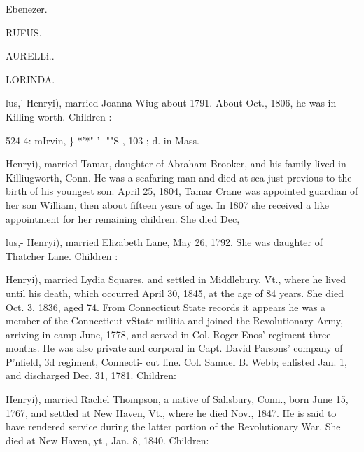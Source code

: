 \documentclass[oneside]{book}
\begin{document}
Ebenezer. 




RUFUS. 




AURELLi.. 




LORINDA. 




lus,' Henryi), married Joanna Wiug about 1791. About Oct., 
1806, he was in Killing worth. Children : 


524-4: mIrvin, \} *'*" '- ""S-, 103 ; d. in Mass. 

Henryi), married Tamar, daughter of Abraham Brooker, and 
his family lived in Killiugworth, Conn. He was a seafaring man 
and died at sea just previous to the birth of his youngest son. 
April 25, 1804, Tamar Crane was appointed guardian of her son 
William, then about fifteen years of age. In 1807 she received a 
like appointment for her remaining children. She died Dec, 







lus,- Henryi), married Elizabeth Lane, May 26, 1792. She was 
daughter of Thatcher Lane. Children : 










Henryi), married Lydia Squares, and settled in Middlebury, Vt., 
where he lived until his death, which occurred April 30, 1845, at 
the age of 84 years. She died Oct. 3, 1836, aged 74. From 
Connecticut State records it appears he was a member of the 
Connecticut vState militia and joined the Revolutionary Army, 
arriving in camp June, 1778, and served in Col. Roger Enos' 
regiment three months. He was also private and corporal in 
Capt. David Parsons' company of P'nfield, 3d regiment, Connecti- 
cut line. Col. Samuel B. Webb; enlisted Jan. 1, and discharged 
Dec. 31, 1781. Children: 








Henryi), married Rachel Thompson, a native of Salisbury, Conn., 
born June 15, 1767, and settled at New Haven, Vt., where he 
died Nov., 1847. He is said to have rendered service during the 
latter portion of the Revolutionary War. She died at New 
Haven, yt., Jan. 8, 1840. Children: 
\end{document}
